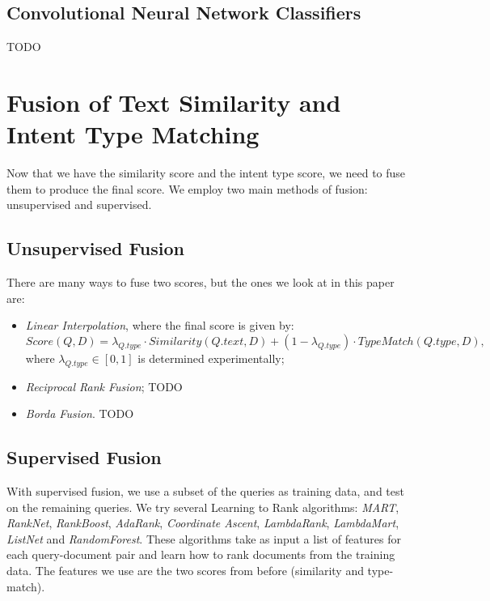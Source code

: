 \subsection{Convolutional Neural Network Classifiers}
TODO

\section{Fusion of Text Similarity and Intent Type Matching}
Now that we have the similarity score and the intent type score, we need to fuse them to produce the final score.
We employ two main methods of fusion: unsupervised and supervised.

\subsection{Unsupervised Fusion}
There are many ways to fuse two scores, but the ones we look at in this paper are:
\begin{itemize}
 \item \emph{Linear Interpolation}, where the final score is given by:
\[  Score(Q, D) = \lambda_{Q.type} \cdot Similarity(Q.text, D) + (1-\lambda_{Q.type}) \cdot TypeMatch(Q.type, D),\]
where $\lambda_{Q.type} \in [0,1]$ is determined experimentally;
 \item \emph{Reciprocal Rank Fusion}; TODO
 \item \emph{Borda Fusion}. TODO
\end{itemize}

\subsection{Supervised Fusion}
With supervised fusion, we use a subset of the queries as training data, and test on the remaining queries.
We try several Learning to Rank algorithms: \emph{MART}, \emph{RankNet}, \emph{RankBoost}, \emph{AdaRank},
\emph{Coordinate Ascent}, \emph{LambdaRank}, \emph{LambdaMart}, \emph{ListNet} and \emph{RandomForest}.
These algorithms take as input a list of features for each query-document pair and learn how to rank documents from the training
data.
The features we use are the two scores from before (similarity and type-match).


